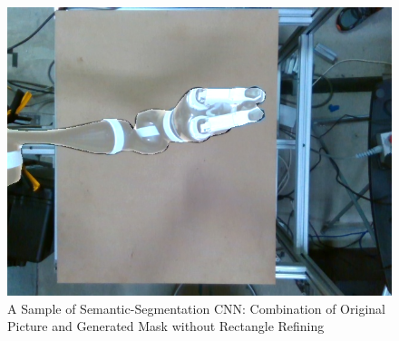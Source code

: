 \documentclass[10pt,journal,compsoc, draftclsnofoot,onecolumn]{IEEEtran}
\begin{document}
\begin{figure}[H]
  \begin{center}
    \includegraphics[width=1.\textwidth]{combined_112.png}
  \end{center}
  \caption{A Sample of Semantic-Segmentation CNN: Combination of Original Picture and Generated Mask without Rectangle Refining}
\end{figure}

\newpage
\nocite{*}%


\end{document}
